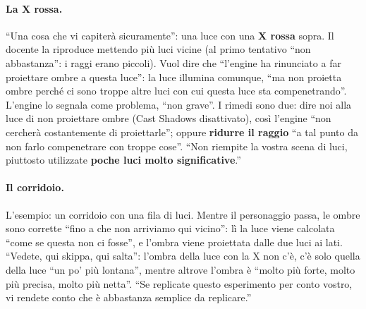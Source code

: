 \paragraph{La X rossa.} ``Una cosa che vi capiterà sicuramente'': una luce con una
\textbf{X rossa} sopra. Il docente la riproduce mettendo più luci vicine (al primo tentativo
``non abbastanza'': i raggi erano piccoli). Vuol dire che ``l'engine ha rinunciato a far
proiettare ombre a questa luce'': la luce illumina comunque, ``ma non proietta ombre perché
ci sono troppe altre luci con cui questa luce sta compenetrando''. L'engine lo segnala come
problema, ``non grave''. I rimedi sono due: dire noi alla luce di non proiettare ombre
(Cast Shadows disattivato), così l'engine ``non cercherà costantemente di proiettarle'';
oppure \textbf{ridurre il raggio} ``a tal punto da non farlo compenetrare con troppe cose''.
``Non riempite la vostra scena di luci, piuttosto utilizzate \textbf{poche luci molto
significative}.''

\paragraph{Il corridoio.} L'esempio: un corridoio con una fila di luci. Mentre il
personaggio passa, le ombre sono corrette ``fino a che non arriviamo qui vicino'': lì la
luce viene calcolata ``come se questa non ci fosse'', e l'ombra viene proiettata dalle due
luci ai lati. ``Vedete, qui skippa, qui salta'': l'ombra della luce con la X non c'è, c'è
solo quella della luce ``un po' più lontana'', mentre altrove l'ombra è ``molto più forte,
molto più precisa, molto più netta''. ``Se replicate questo esperimento per conto vostro, vi
rendete conto che è abbastanza semplice da replicare.''

